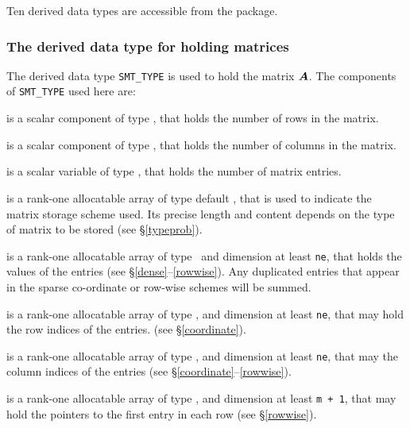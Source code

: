 \documentclass{galahad}
\begin{document}



%


\galtypes
Ten derived data types are accessible from the package.


\subsubsection{The derived data type for holding matrices}\label{typesmt}
The derived data type {\tt SMT\_TYPE} is used to hold the matrix ${\bm{A}}$.
The components of {\tt SMT\_TYPE} used here are:

\begin{description}

 is a scalar component of type \integer,
that holds the number of rows in the matrix.

 is a scalar component of type \integer,
that holds the number of columns in the matrix.

 is a scalar variable of type \integer, that
holds the number of matrix entries.

 is a rank-one allocatable array of type default \character, that
is used to indicate the matrix storage scheme used. Its precise length and
content depends on the type of matrix to be stored (see \S\ref{typeprob}).

 is a rank-one allocatable array of type \realdp\,
and dimension at least {\tt ne}, that holds the values of the entries
(see \S\ref{dense}--\ref{rowwise}).
Any duplicated entries that appear in the sparse
co-ordinate or row-wise schemes will be summed.

 is a rank-one allocatable array of type \integer,
and dimension at least {\tt ne}, that may hold the row indices of the entries.
(see \S\ref{coordinate}).

 is a rank-one allocatable array of type \integer,
and dimension at least {\tt ne}, that may the column indices of the entries
(see \S\ref{coordinate}--\ref{rowwise}).

 is a rank-one allocatable array of type \integer,
and dimension at least {\tt m + 1}, that may hold the pointers to
the first entry in each row (see \S\ref{rowwise}).

\end{description}
\end{document}
